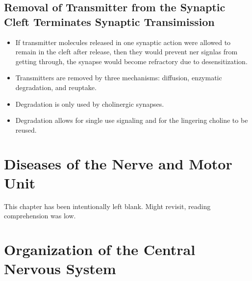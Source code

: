 \documentclass[12pt,a4paper]{article}
\begin{document}
\subsection{Removal of Transmitter from the Synaptic Cleft Terminates Synaptic Transimission}
\begin{itemize}
    \item If transmitter molecules released in one synaptic action were allowed to remain in the cleft after release, then they would prevent ner signlas from getting through, the synapse would become refractory due to desensitization.
    \item Transmitters are removed by three mechanisms: diffusion, enzymatic degradation, and reuptake.
    \item Degradation is only used by cholinergic synapses.
    \item Degradation allows for single use signaling and for the lingering choline to be reused.
\end{itemize}

\clearpage
\section{Diseases of the Nerve and Motor Unit}
\begin{center}
    This chapter has been intentionally left blank. Might revisit, reading comprehension was low.
\end{center}


\clearpage
{}
\clearpage
\section{Organization of the Central Nervous System}
\end{document}
